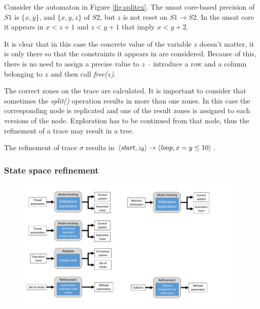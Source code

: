 \begin{runningExample}
\begin{example}
	Consider the automaton in Figure \ref{fig:splitex}. The unsat core-based precision of $S1$ is $\{x,y\}$, and $\{x,y,z\}$ of $S2$, but $z$ is not reset on $S1 \to S2$. In the unsat core it appears in $x < z+1$ and $z < y+1$ that imply $x < y+2$.
\end{example}

It is clear that in this case the concrete value of the variable $z$ doesn't matter, it is only there so that the constraints it appears in are considered. Because of this, there is no need to assign a precise value to $z$ -- introduce a row and a column belonging to $z$ and then call \emph{free($z$)}.

The correct zones on the trace are calculated. It is important to consider that sometimes the \emph{split()} operation results in more than one zones. In this case the corresponding node is replicated and one of the result zones is assigned to each versions of the node. Exploration has to be continued from that node, thus the refinement of a trace may result in a tree.

\begin{runningExample}
	The refinement of trace $\sigma$ results in $\langle \text{\emph{start}}, z_\emptyset \rangle \to \langle \text{\emph{loop}}, x=y \leq 10 \rangle$.
\end{runningExample}



\subsubsection{State space refinement}

\begin{figure}[h]
	\centering
	\includegraphics[width=.7\textwidth]{include/figures/modules_ssp_ref}
\end{figure}



\end{runningExample}

